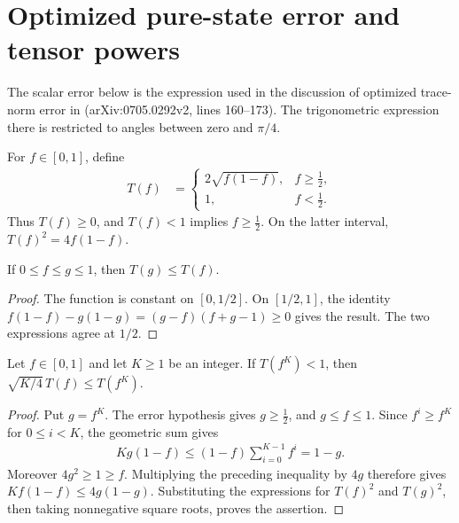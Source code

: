 \section{Optimized pure-state error and tensor powers}

The scalar error below is the expression used in the discussion of optimized
trace-norm error in \cite{Schuch2008Entropy}
(arXiv:0705.0292v2, lines 160--173). The trigonometric expression there is
restricted to angles between zero and $\pi/4$.

\begin{definition}
    \label{def:optimized_pure_trace_error}
    \leanok
    For $f\in[0,1]$, define
    \begin{align}
        T(f) & =\begin{cases}
                    2\sqrt{f(1-f)}, & f\ge\tfrac12, \\
                    1,              & f<\tfrac12.
                \end{cases}
        \label{eq:optimized_error_scalar}
    \end{align}
    Thus $T(f)\ge0$, and $T(f)<1$ implies $f\ge\tfrac12$.
    On the latter interval, $T(f)^2=4f(1-f)$.
\end{definition}

\begin{lemma}
    \label{lem:optimized_pure_error_monotone}
    \leanok
    If $0\le f\le g\le1$, then $T(g)\le T(f)$.
\end{lemma}
\begin{proof}\leanok
    The function is constant on $[0,1/2]$. On $[1/2,1]$, the identity
    $f(1-f)-g(1-g)=(g-f)(f+g-1)\ge0$ gives the result.
    The two expressions agree at $1/2$.
\end{proof}

\begin{theorem}
    \label{thm:optimized_pure_error_power_small}
    \leanok
    Let $f\in[0,1]$ and let $K\ge1$ be an integer. If $T(f^K)<1$, then
    $\sqrt{K/4}\,T(f)\le T(f^K)$.
\end{theorem}
\begin{proof}\leanok
    Put $g=f^K$. The error hypothesis gives $g\ge\tfrac12$, and
    $g\le f\le1$. Since $f^i\ge f^K$ for $0\le i<K$, the geometric sum gives
    \begin{align*}
        Kg(1-f)\le (1-f)\sum_{i=0}^{K-1}f^i=1-g.
    \end{align*}
    Moreover $4g^2\ge1\ge f$. Multiplying the preceding inequality by
    $4g$ therefore gives $Kf(1-f)\le4g(1-g)$.
    Substituting the expressions for $T(f)^2$ and $T(g)^2$, then taking
    nonnegative square roots, proves the assertion.
\end{proof}

